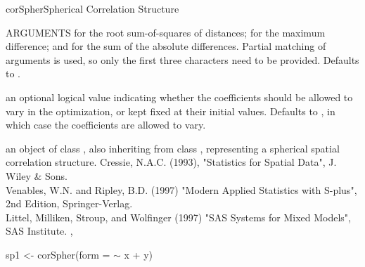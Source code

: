 \documentclass[pdftex]{article} \usepackage{url,graphicx}
\renewcommand{\Twiddle}{\mbox{\(\sim\)}}
\begin{document}
\begin{Helpfile}{corSpher}{Spherical Correlation Structure}
\begin{Argument}{ARGUMENTS}
 for the root sum-of-squares of distances;
 for the maximum difference; and 
for the sum of the absolute differences. Partial matching of
arguments is used, so only the first three characters need to be
provided. Defaults to .
\item[\Co{fixed:}]
an optional logical value indicating whether the
coefficients should be allowed to vary in the optimization, or kept
fixed at their initial values. Defaults to , in which case
the coefficients are allowed to vary.
\end{Argument}
an object of class , also inheriting from class
, representing a spherical spatial correlation
structure.
  Cressie, N.A.C. (1993), "Statistics for Spatial Data", J. Wiley \& Sons.\\
Venables, W.N. and Ripley, B.D. (1997) "Modern Applied Statistics with
S-plus", 2nd Edition, Springer-Verlag.\\
Littel, Milliken, Stroup, and Wolfinger (1997) "SAS Systems for Mixed
Models", SAS Institute.
, 
\need 15pt
\vspace{-16pt}
\begin{Example}
sp1 <- corSpher(form = {\Twiddle} x + y)
\end{Example}
\end{Helpfile}
\end{document}
